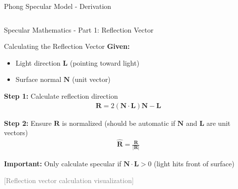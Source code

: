 \begin{frame}{Phong Specular Model - Derivation}
\begin{columns}
\begin{column}{0.4\textwidth}
    \end{column}
  \end{columns}
\end{frame}

\begin{frame}{Specular Mathematics - Part 1: Reflection Vector}
  \begin{mathbox}{Calculating the Reflection Vector}
    \textbf{Given:}
    \begin{itemize}
      \item Light direction $\mathbf{L}$ (pointing toward light)
      \item Surface normal $\mathbf{N}$ (unit vector)
    \end{itemize}

    \vspace{0.3cm}
    \textbf{Step 1:} Calculate reflection direction
    \begin{align}
      \mathbf{R} = 2(\mathbf{N} \cdot \mathbf{L})\mathbf{N} - \mathbf{L}
    \end{align}

    \pause
    \textbf{Step 2:} Ensure $\mathbf{R}$ is normalized (should be automatic if $\mathbf{N}$ and $\mathbf{L}$ are unit vectors)
    \begin{align}
      \hat{\mathbf{R}} = \frac{\mathbf{R}}{|\mathbf{R}|}
    \end{align}

    \pause
    \textbf{Important:} Only calculate specular if $\mathbf{N} \cdot \mathbf{L} > 0$ (light hits front of surface)
  \end{mathbox}

  \vspace{0.3cm}
  \pause
  \textcolor{gray}{[Reflection vector calculation visualization]}
\end{frame}

